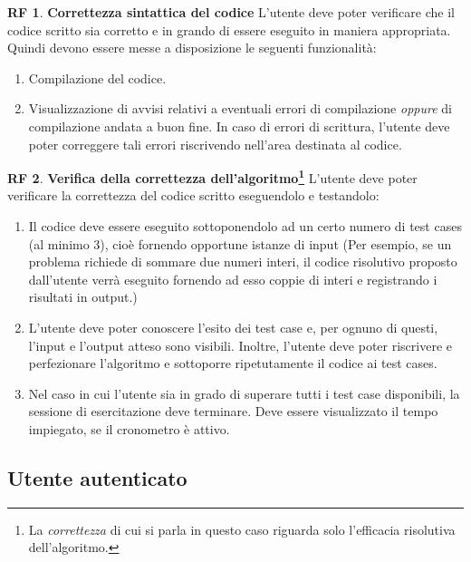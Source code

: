 \documentclass[11pt, a4paper]{article}
\theoremstyle{definition}
\newtheorem{funcreq}{RF} %
\begin{document}
\begin{funcreq}
\label{sintax}
\textbf{Correttezza sintattica del codice }
L'utente deve poter verificare che il codice scritto sia corretto e in grando di essere eseguito in maniera appropriata.
Quindi devono essere messe a disposizione le seguenti funzionalità:
\begin{enumerate}
    \item Compilazione del codice.
    \item Visualizzazione di avvisi relativi a eventuali errori di compilazione
    \textit{oppure} di compilazione andata a buon fine. In caso di errori
    di scrittura, l'utente deve poter correggere tali errori riscrivendo
    nell'area destinata al codice.
\end{enumerate}
\end{funcreq}

\begin{funcreq}
\label{test}
\textbf{Verifica della correttezza dell'algoritmo\footnote{La \textit{correttezza} di cui si parla in questo caso riguarda solo l'efficacia risolutiva dell'algoritmo.} }
L'utente deve poter verificare la correttezza del codice scritto eseguendolo
e testandolo:
\begin{enumerate}
    \item Il codice deve essere eseguito sottoponendolo ad un certo numero
    di test cases (al minimo 3),
    cioè fornendo opportune istanze di input (Per esempio,
    se un problema richiede di sommare due numeri interi, il codice risolutivo
    proposto dall'utente verrà eseguito fornendo ad esso coppie di interi
    e registrando i risultati in output.)

    \item L'utente deve poter conoscere l'esito dei test case e, per ognuno
    di questi, l'input e l'output atteso sono visibili.
    Inoltre, l'utente deve poter riscrivere e perfezionare l'algoritmo e
    sottoporre ripetutamente il codice ai test cases.

    \item Nel caso in cui l'utente sia in grado di superare tutti i
    test case disponibili, la sessione di esercitazione deve terminare.
    Deve essere visualizzato il tempo impiegato, se il cronometro è attivo.
\end{enumerate}
\end{funcreq}

\begin{center}
    \section*{Utente autenticato}
\end{center}
\end{document}
